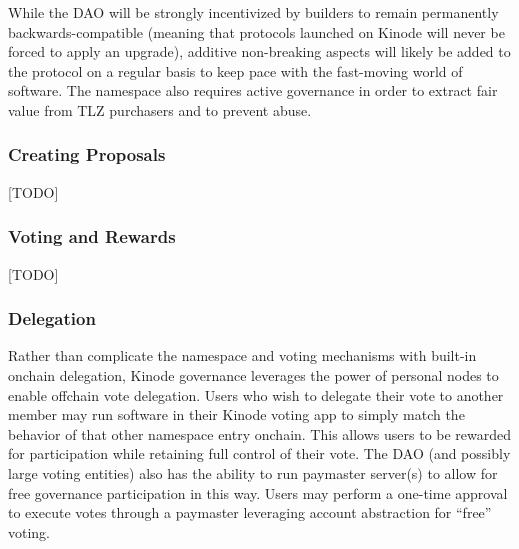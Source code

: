 \documentclass[runningheads]{llncs}
\begin{document}
While the DAO will be strongly incentivized by builders to remain permanently backwards-compatible (meaning that protocols launched on Kinode will never be forced to apply an upgrade), additive non-breaking aspects will likely be added to the protocol on a regular basis to keep pace with the fast-moving world of software. The namespace also requires active governance in order to extract fair value from TLZ purchasers and to prevent abuse.

\subsubsection{Creating Proposals}
\label{sec:daoproposals}

[TODO]

\subsubsection{Voting and Rewards}
\label{sec:daovoting}

[TODO]

\subsubsection{Delegation}
\label{sec:daodelegation}

Rather than complicate the namespace and voting mechanisms with built-in onchain delegation, Kinode governance leverages the power of personal nodes to enable offchain vote delegation.
Users who wish to delegate their vote to another member may run software in their Kinode voting app to simply match the behavior of that other namespace entry onchain.
This allows users to be rewarded for participation while retaining full control of their vote.
The DAO (and possibly large voting entities) also has the ability to run paymaster server(s) to allow for free governance participation in this way.
Users may perform a one-time approval to execute votes through a paymaster leveraging account abstraction for “free” voting.
\end{document}

